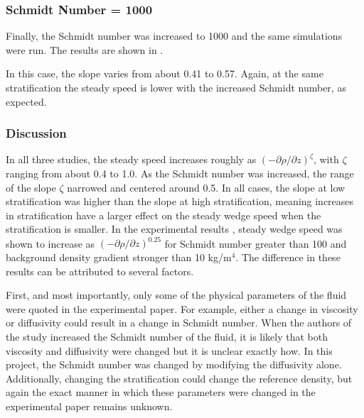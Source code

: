 \documentclass[12pt]{article}
\begin{document}

\subsubsection{Schmidt Number = 1000}

Finally, the Schmidt number was increased to 1000 and the same simulations were run. The results are shown in .


In this case, the slope varies from about 0.41 to 0.57. Again, at the same stratification the steady speed is lower with the increased Schmidt number, as expected. 

\subsubsection{Discussion}

In all three studies, the steady speed increases roughly as $(-\partial\rho/\partial z)^\zeta$, with $\zeta$ ranging from about 0.4 to 1.0. As the Schmidt number was increased, the range of the slope $\zeta$ narrowed and centered around 0.5. In all cases, the slope at low stratification was higher than the slope at high stratification, meaning increases in stratification have a larger effect on the steady wedge speed when the stratification is smaller. In the experimental results \cite{allshouse2010propulsion}, steady wedge speed was shown to increase as $(-\partial\rho/\partial z)^{0.25}$ for Schmidt number greater than 100 and background density gradient stronger than 10 kg/m$^{4}$. The difference in these results can be attributed to several factors.

First, and most importantly, only some of the physical parameters of the fluid were quoted in the experimental paper. For example, either a change in viscosity or diffusivity could result in a change in Schmidt number. When the authors of the study increased the Schmidt number of the fluid, it is likely that both viscosity and diffusivity were changed but it is unclear exactly how. In this project, the Schmidt number was changed by modifying the diffusivity alone. Additionally, changing the stratification could change the reference density, but again the exact manner in which these parameters were changed in the experimental paper remains unknown.
\end{document}
